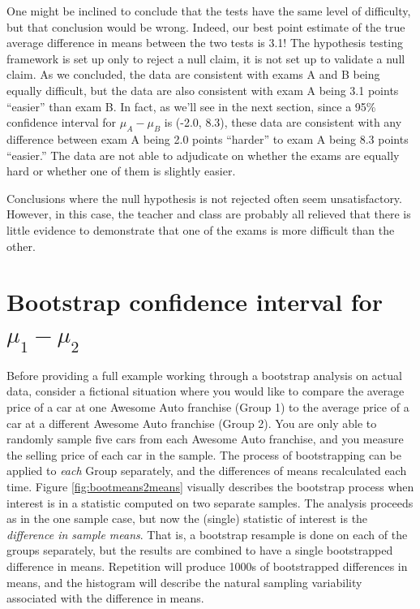 \documentclass[
  10pt,
  openany]{book}
\theoremstyle{definition}
\theoremstyle{definition}
\theoremstyle{definition}
\theoremstyle{definition}
\theoremstyle{remark}
\begin{document}
One might be inclined to conclude that the tests have the same level of difficulty, but that conclusion would be wrong. Indeed, our best point estimate of the true average difference in means between the two tests is 3.1!
The hypothesis testing framework is set up only to reject a null claim, it is not set up to validate a null claim.
As we concluded, the data are consistent with exams A and B being equally difficult, but the data are also consistent with exam A being 3.1 points ``easier'' than exam B. In fact, as we'll see in the next section, since a 95\% confidence interval for \(\mu_A - \mu_B\) is (-2.0, 8.3), these data are consistent with any difference between exam A being 2.0 points ``harder'' to exam A being 8.3 points ``easier.''
The data are not able to adjudicate on whether the exams are equally hard or whether one of them is slightly easier.

Conclusions where the null hypothesis is not rejected often seem unsatisfactory.
However, in this case, the teacher and class are probably all relieved that there is little evidence to demonstrate that one of the exams is more difficult than the other.


\section{\texorpdfstring{Bootstrap confidence interval for \(\mu_1 - \mu_2\)}{Bootstrap confidence interval for \textbackslash mu\_1 - \textbackslash mu\_2}}\label{boot-ci-diff-means}


Before providing a full example working through a bootstrap analysis on actual data, consider a fictional situation where you would like to compare the average price of a car at one Awesome Auto franchise (Group 1) to the average price of a car at a different Awesome Auto franchise (Group 2). You are only able to randomly sample five cars from each Awesome Auto franchise, and you measure the selling price of each car in the sample. The process of bootstrapping can be applied to \emph{each} Group separately, and the differences of means recalculated each time. Figure \ref{fig:bootmeans2means} visually describes the bootstrap process when interest is in a statistic computed on two separate samples. The analysis proceeds as in the one sample case, but now the (single) statistic of interest is the \emph{difference in sample means}. That is, a bootstrap resample is done on each of the groups separately, but the results are combined to have a single bootstrapped difference in means. Repetition will produce 1000s of bootstrapped differences in means, and the histogram will describe the natural sampling variability associated with the difference in means.
\end{document}
